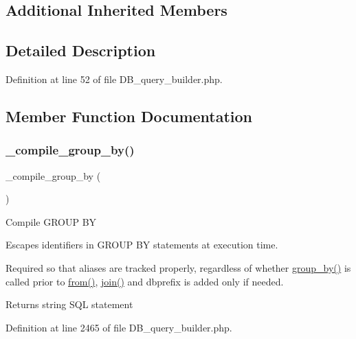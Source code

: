 \subsection*{Additional Inherited Members}


\subsection{Detailed Description}


Definition at line 52 of file D\+B\+\_\+query\+\_\+builder.\+php.



\subsection{Member Function Documentation}
\mbox{\label{class_c_i___d_b__query__builder_a953e760f382d7187dc5d7b238a7ff439}} 
\subsubsection{\texorpdfstring{\_compile\_group\_by()}{\_compile\_group\_by()}}
{\footnotesize\ttfamily \+\_\+compile\+\_\+group\+\_\+by (\begin{DoxyParamCaption}{ }\end{DoxyParamCaption})\hspace{0.3cm}{\ttfamily [protected]}}

Compile G\+R\+O\+UP BY

Escapes identifiers in G\+R\+O\+UP BY statements at execution time.

Required so that aliases are tracked properly, regardless of whether \mbox{\hyperlink{class_c_i___d_b__query__builder_a111cc822f85357c4cfe37886e6315dce}{group\+\_\+by()}} is called prior to \mbox{\hyperlink{class_c_i___d_b__query__builder_a91f5f004ed8e2237a4decc5d23ac3457}{from()}}, \mbox{\hyperlink{class_c_i___d_b__query__builder_a54557b1ef757507cbbd2a8802a99810b}{join()}} and dbprefix is added only if needed.

\begin{DoxyReturn}{Returns}
string S\+QL statement 
\end{DoxyReturn}


Definition at line 2465 of file D\+B\+\_\+query\+\_\+builder.\+php.

